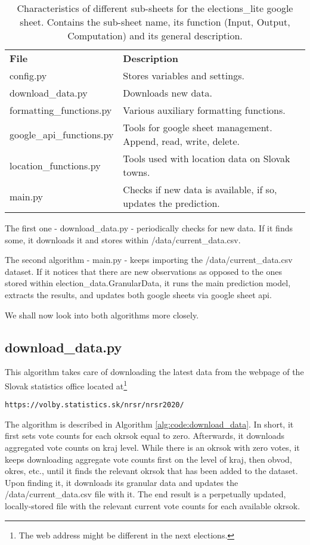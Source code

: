 \documentclass[12pt]{article}
\begin{document}
\begin{table}[h]
	\centering
	\begin{tabularx}{\linewidth}{lX}
		\toprule
		\textbf{File} & \textbf{Description}\\
		config.py & Stores variables and settings. \\
		download\_data.py & Downloads new data. \\
		formatting\_functions.py & Various auxiliary formatting functions. \\
		google\_api\_functions.py & Tools for google sheet management. Append, read, write, delete.  \\
		location\_functions.py & Tools used with location data on Slovak towns.  \\
		main.py & Checks if new data is available, if so, updates the prediction.  \\		
		\bottomrule
	\end{tabularx}
	\caption{Characteristics of different sub-sheets for the elections\_lite google sheet. Contains the sub-sheet name, its function (Input, Output, Computation) and its general description.}
	\label{tab:code:files_functions}
\end{table}

The first one - download\_data.py - periodically checks for new data. If it finds some, it downloads it and stores within /data/current\_data.csv.

The second algorithm - main.py - keeps importing the /data/current\_data.csv dataset. If 
it notices that there are new observations as opposed to the ones stored within election\_data.GranularData, it runs the main prediction model, extracts the results, and updates both google sheets via google sheet api.

We shall now look into both algorithms more closely.

\subsection{download\_data.py}
This algorithm takes care of downloading the latest data from the webpage of the Slovak statistics office located at\footnote{The web address might be different in the next elections.} \begin{verbatim}https://volby.statistics.sk/nrsr/nrsr2020/\end{verbatim}
The algorithm is described in Algorithm \ref{alg:code:download_data}. In short, it first sets vote counts for each okrsok equal to zero. Afterwards, it downloads aggregated vote counts on kraj level. While there is an okrsok with zero votes, it keeps downloading aggregate vote counts first on the level of kraj, then obvod, okres, etc., until it finds the relevant okrsok that has been added to the dataset. Upon finding it, it downloads its granular data and updates  the /data/current\_data.csv file with it.
The end result is a perpetually updated, locally-stored file with the relevant current vote counts for each available okrsok.
\end{document}
